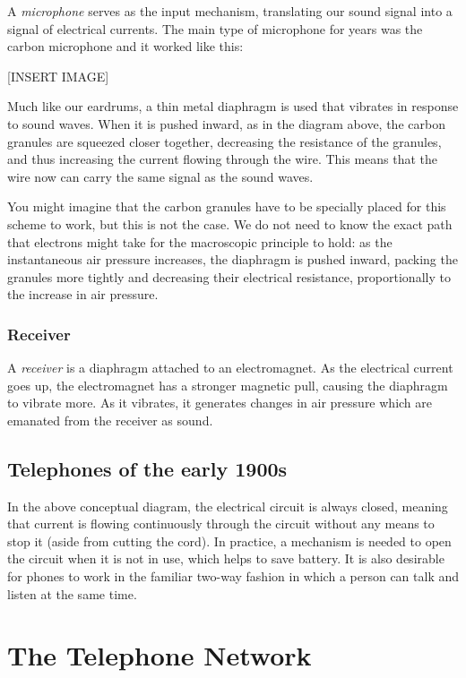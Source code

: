 \documentclass[UTF8]{book}
\begin{document}
\begin{CJK}{UTF8}{gbsn}
A \emph{microphone} serves as the input mechanism, translating our sound signal into a signal of electrical currents. The main type of microphone for years was the carbon microphone and it worked like this:

[INSERT IMAGE]

Much like our eardrums, a thin metal diaphragm is used that vibrates in response to sound waves. When it is pushed inward, as in the diagram above, the carbon granules are squeezed closer together, decreasing the resistance of the granules, and thus increasing the current flowing through the wire. This means that the wire now can carry the same signal as the sound waves.

You might imagine that the carbon granules have to be specially placed for this scheme to work, but this is not the case. We do not need to know the exact path that electrons might take for the macroscopic principle to hold: as the instantaneous air pressure increases, the diaphragm is pushed inward, packing the granules more tightly and decreasing their electrical resistance, proportionally to the increase in air pressure.

\subsection{Receiver}

A \emph{receiver} is a diaphragm attached to an electromagnet. As the electrical current goes up, the electromagnet has a stronger magnetic pull, causing the diaphragm to vibrate more. As it vibrates, it generates changes in air pressure which are emanated from the receiver as sound.

\section{Telephones of the early 1900s}

In the above conceptual diagram, the electrical circuit is always closed, meaning that current is flowing continuously through the circuit without any means to stop it (aside from cutting the cord). In practice, a mechanism is needed to open the circuit when it is not in use, which helps to save battery. It is also desirable for phones to work in the familiar two-way fashion in which a person can talk and listen at the same time.


\chapter{The Telephone Network}


\end{CJK}
\end{document}
